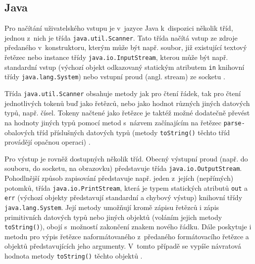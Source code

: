 \documentclass[czech,BP]{thesiskiv}
\begin{document}
\subsection{Java}
Pro načítání uživatelského vstupu je v~jazyce Java k~dispozici několik tříd, jednou z~nich je třída \texttt{java.util.Scanner}. Tato třída načítá vstup ze zdroje předaného v~konstruktoru, kterým může být např. soubor, již existující textový řetězec nebo instance třídy \texttt{java.io.InputStream}, kterou může být např. standardní vstup (výchozí objekt odkazovaný statickým atributem \texttt{in} knihovní třídy \texttt{java.lang.System}) nebo vstupní proud (angl. stream) ze socketu \cite{java-guide-scanner, java-guide-inputstream, java-guide-system}.\par
Třída \texttt{java.util.Scanner} obsahuje metody jak pro čtení řádek, tak pro čtení jednotlivých tokenů buď jako řetězců, nebo jako hodnot různých jiných datových typů, např. čísel. Tokeny načtené jako řetězce je taktéž možné dodatečně převést na hodnoty jiných typů pomocí metod s~názvem začínajícím na řetězec \texttt{parse-} obalových tříd příslušných datových typů (metody \texttt{toString()} těchto tříd provádějí opačnou operaci) \cite{java-guide-scanner, java-guide-byte, java-guide-short, java-guide-integer, java-guide-long, java-guide-float, java-guide-double, java-guide-boolean, java-guide-character}.\par
Pro výstup je rovněž dostupných několik tříd. Obecný výstupní proud (např. do souboru, do socketu, na obrazovku) představuje třída \texttt{java.io\-.OutputStream}. Pohodlnější způsob zapisování představuje např. jeden z~jejích (nepřímých) potomků, třída \texttt{java.io.PrintStream}, která je typem statických atributů \texttt{out} a \texttt{err} (výchozí objekty představují standardní a chybový výstup) knihovní třídy \texttt{java.lang.System}. Její metody umožňují kromě zápisu řetězců i zápis primitivních datových typů nebo jiných objektů (voláním jejich metody \texttt{toString()}), obojí s~možností zakončení znakem nového řádku. Dále poskytuje i metodu pro výpis řetězce naformátovaného z~předaného formátovacího řetězce a objektů představujících jeho argumenty. V~tomto případě se vypíše návratová hodnota metody \texttt{toString()} těchto objektů \cite{java-guide-outputstream, java-guide-printstream, java-guide-system}.
\end{document}
